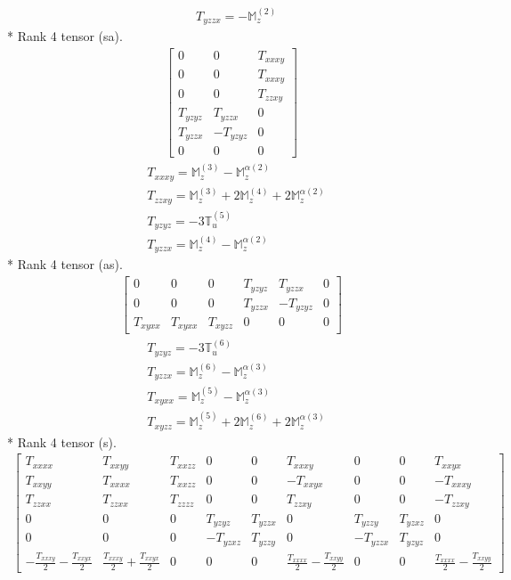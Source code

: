 \documentclass[fleqn,8pt,landscape]{jsarticle}
\begin{document}
\begin{align*}
& T_{yzzx} = - \mathbb{M}_{z}^{(2)}
\end{align*}
* Rank 4 tensor (sa).
\begin{align*}
\begin{bmatrix} 0 & 0 & T_{xxxy} \\ 0 & 0 & T_{xxxy} \\ 0 & 0 & T_{zzxy} \\ T_{yzyz} & T_{yzzx} & 0 \\ T_{yzzx} & - T_{yzyz} & 0 \\ 0 & 0 & 0 \end{bmatrix}
\end{align*}
\begin{align*}
& T_{xxxy} = \mathbb{M}_{z}^{(3)} - \mathbb{M}_{z}^{\alpha(2)} \\
& T_{zzxy} = \mathbb{M}_{z}^{(3)} + 2 \mathbb{M}_{z}^{(4)} + 2 \mathbb{M}_{z}^{\alpha(2)} \\
& T_{yzyz} = - 3 \mathbb{T}_{u}^{(5)} \\
& T_{yzzx} = \mathbb{M}_{z}^{(4)} - \mathbb{M}_{z}^{\alpha(2)}
\end{align*}
* Rank 4 tensor (as).
\begin{align*}
\begin{bmatrix} 0 & 0 & 0 & T_{yzyz} & T_{yzzx} & 0 \\ 0 & 0 & 0 & T_{yzzx} & - T_{yzyz} & 0 \\ T_{xyxx} & T_{xyxx} & T_{xyzz} & 0 & 0 & 0 \end{bmatrix}
\end{align*}
\begin{align*}
& T_{yzyz} = - 3 \mathbb{T}_{u}^{(6)} \\
& T_{yzzx} = \mathbb{M}_{z}^{(6)} - \mathbb{M}_{z}^{\alpha(3)} \\
& T_{xyxx} = \mathbb{M}_{z}^{(5)} - \mathbb{M}_{z}^{\alpha(3)} \\
& T_{xyzz} = \mathbb{M}_{z}^{(5)} + 2 \mathbb{M}_{z}^{(6)} + 2 \mathbb{M}_{z}^{\alpha(3)}
\end{align*}
* Rank 4 tensor (s).
\begin{align*}
\begin{bmatrix} T_{xxxx} & T_{xxyy} & T_{xxzz} & 0 & 0 & T_{xxxy} & 0 & 0 & T_{xxyx} \\ T_{xxyy} & T_{xxxx} & T_{xxzz} & 0 & 0 & - T_{xxyx} & 0 & 0 & - T_{xxxy} \\ T_{zzxx} & T_{zzxx} & T_{zzzz} & 0 & 0 & T_{zzxy} & 0 & 0 & - T_{zzxy} \\ 0 & 0 & 0 & T_{yzyz} & T_{yzzx} & 0 & T_{yzzy} & T_{yzxz} & 0 \\ 0 & 0 & 0 & - T_{yzxz} & T_{yzzy} & 0 & - T_{yzzx} & T_{yzyz} & 0 \\ - \frac{T_{xxxy}}{2} - \frac{T_{xxyx}}{2} & \frac{T_{xxxy}}{2} + \frac{T_{xxyx}}{2} & 0 & 0 & 0 & \frac{T_{xxxx}}{2} - \frac{T_{xxyy}}{2} & 0 & 0 & \frac{T_{xxxx}}{2} - \frac{T_{xxyy}}{2} \end{bmatrix}
\end{align*}
\end{document}
